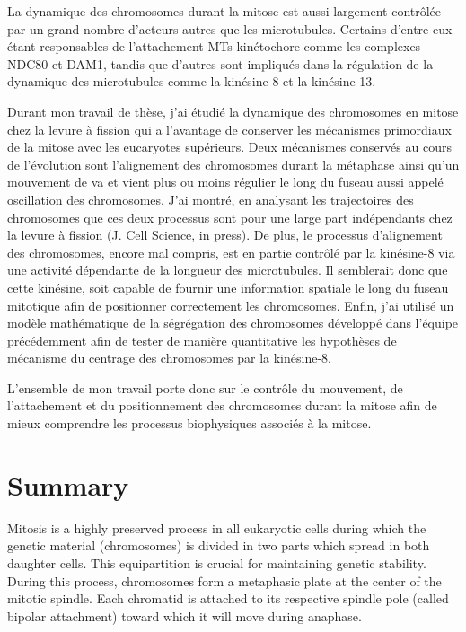 \documentclass[12pt,a4paper,twoside,openright]{book}
\begin{document}
La dynamique des chromosomes durant la mitose est aussi largement
contrôlée par un grand nombre d'acteurs autres que les microtubules.
Certains d'entre eux étant responsables de l'attachement MTs-kinétochore
comme les complexes NDC80 et DAM1, tandis que d'autres sont impliqués
dans la régulation de la dynamique des microtubules comme la kinésine-8
et la kinésine-13.

Durant mon travail de thèse, j'ai étudié la dynamique des chromosomes en
mitose chez la levure à fission qui a l'avantage de conserver les
mécanismes primordiaux de la mitose avec les eucaryotes supérieurs. Deux
mécanismes conservés au cours de l'évolution sont l'alignement des
chromosomes durant la métaphase ainsi qu'un mouvement de va et vient
plus ou moins régulier le long du fuseau aussi appelé oscillation des
chromosomes. J'ai montré, en analysant les trajectoires des chromosomes
que ces deux processus sont pour une large part indépendants chez la
levure à fission (J. Cell Science, in press). De plus, le processus
d'alignement des chromosomes, encore mal compris, est en partie contrôlé
par la kinésine-8 via une activité dépendante de la longueur des
microtubules. Il semblerait donc que cette kinésine, soit capable de
fournir une information spatiale le long du fuseau mitotique afin de
positionner correctement les chromosomes. Enfin, j'ai utilisé un modèle
mathématique de la ségrégation des chromosomes développé dans l'équipe
précédemment afin de tester de manière quantitative les hypothèses de
mécanisme du centrage des chromosomes par la kinésine-8.

L'ensemble de mon travail porte donc sur le contrôle du mouvement, de
l'attachement et du positionnement des chromosomes durant la mitose afin
de mieux comprendre les processus biophysiques associés à la mitose.

\cleardoublepage
\section*{Summary}

Mitosis is a highly preserved process in all eukaryotic cells during
which the genetic material (chromosomes) is divided in two parts which
spread in both daughter cells. This equipartition is crucial for
maintaining genetic stability. During this process, chromosomes form a
metaphasic plate at the center of the mitotic spindle. Each chromatid is
attached to its respective spindle pole (called bipolar attachment)
toward which it will move during anaphase.
\end{document}
